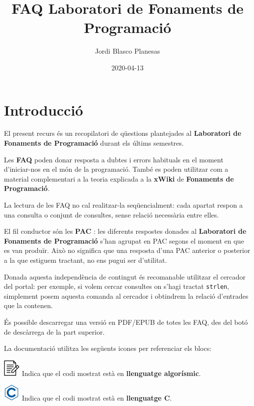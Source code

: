 \documentclass[]{book}
\title{FAQ Laboratori de Fonaments de Programació}
\author{Jordi Blasco Planesas}
\date{2020-04-13}
\begin{document}
\maketitle

{
\setcounter{tocdepth}{1}
\tableofcontents
}
\chapter*{Introducció}\label{introduccio}

El present recurs és un recopilatori de qüestions plantejades al
\textbf{Laboratori de Fonaments de Programació} durant els últims
semestres.

Les \textbf{FAQ} poden donar resposta a dubtes i errors habituals en el
moment d'iniciar-nos en el món de la programació. També es poden
utilitzar com a material complementari a la teoria explicada a la
\textbf{xWiki} de \textbf{Fonaments de Programació}.

La lectura de les FAQ no cal realitzar-la seqüencialment: cada apartat
respon a una consulta o conjunt de consultes, sense relació necessària
entre elles.

El fil conductor són les \textbf{PAC} : les diferents respostes donades
al \textbf{Laboratori de Fonaments de Programació} s'han agrupat en PAC
segons el moment en que es van produïr. Això no significa que una
resposta d'una PAC anterior o posterior a la que estiguem tractant, no
ens pugui ser d'utilitat.

Donada aquesta independència de contingut és recomanable utilitzar el
cercador del portal: per exemple, si volem cercar consultes on s'hagi
tractat \texttt{strlen}, simplement posem aquesta comanda al cercador i
obtindrem la relació d'entrades que la contenen.

És possible descarregar una versió en PDF/EPUB de totes les FAQ, des del
botó de descàrrega de la part superior.

La documentació utilitza les següents icones per referenciar els blocs:

\includegraphics{./img/alg.png} Indica que el codi mostrat està en
\textbf{llenguatge algorísmic}.

\includegraphics{./img/c.png} Indica que el codi mostrat està en
\textbf{llenguatge C}.
\end{document}

